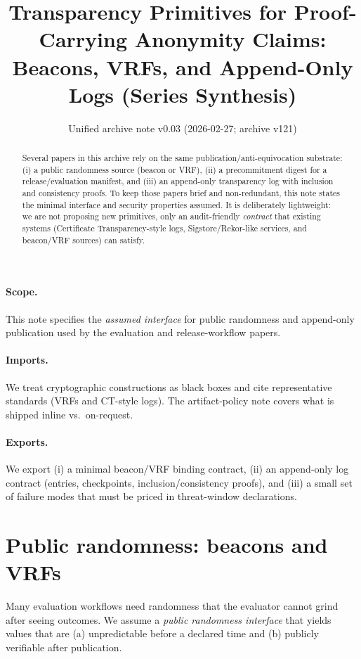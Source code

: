 \documentclass[11pt]{article}
\title{Transparency Primitives for Proof-Carrying Anonymity Claims:\\ Beacons, VRFs, and Append-Only Logs (Series Synthesis)}
\author{}
\date{Unified archive note v0.03 (2026-02-27; archive v121)}
\begin{document}
\maketitle

\begin{abstract}
Several papers in this archive rely on the same publication/anti-equivocation substrate:
(i) a public randomness source (beacon or VRF),
(ii) a precommitment digest for a release/evaluation manifest, and
(iii) an append-only transparency log with inclusion and consistency proofs.
To keep those papers brief and non-redundant, this note states the minimal interface and security properties assumed.
It is deliberately lightweight: we are not proposing new primitives, only an audit-friendly \emph{contract} that existing systems (Certificate Transparency-style logs, Sigstore/Rekor-like services, and beacon/VRF sources) can satisfy.
\end{abstract}

\paragraph{Scope.}
This note specifies the \emph{assumed interface} for public randomness and append-only publication used by the evaluation and release-workflow papers.

\paragraph{Imports.}
We treat cryptographic constructions as black boxes and cite representative standards (VRFs and CT-style logs).
The artifact-policy note covers what is shipped inline vs.\ on-request.\cite{series:artifactpolicy}

\paragraph{Exports.}
We export (i) a minimal beacon/VRF binding contract, (ii) an append-only log contract (entries, checkpoints, inclusion/consistency proofs), and (iii) a small set of failure modes that must be priced in threat-window declarations.

\section{Public randomness: beacons and VRFs}
Many evaluation workflows need randomness that the evaluator cannot grind after seeing outcomes.
We assume a \emph{public randomness interface} that yields values that are (a) unpredictable before a declared time and (b) publicly verifiable after publication.
\end{document}

